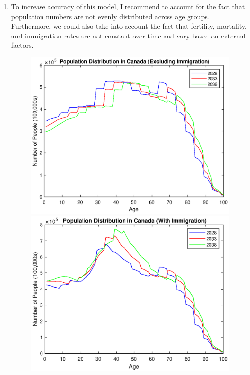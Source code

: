 \documentclass[10pt]{article}
\begin{document}
\begin{enumerate}[leftmargin=\labelsep]
    \item To increase accuracy of this model, I recommend to account for the fact that population numbers are not evenly distributed across age groups.
    Furthermore, we could also take into account the fact that fertility, mortality, and immigration rates are not constant over time and vary based on external factors.

    \begin{figure}[h]
        \begin{minipage}[c]{0.49\linewidth}
        \includegraphics[width=\linewidth]{WithoutImmigration.eps}
        \caption{}
        \end{minipage}
        \hfill
        \begin{minipage}[c]{0.49\linewidth}
        \includegraphics[width=\linewidth]{WithImmigration.eps}
        \caption{}
        \end{minipage}%
    \end{figure}

\end{enumerate}
\end{document}
